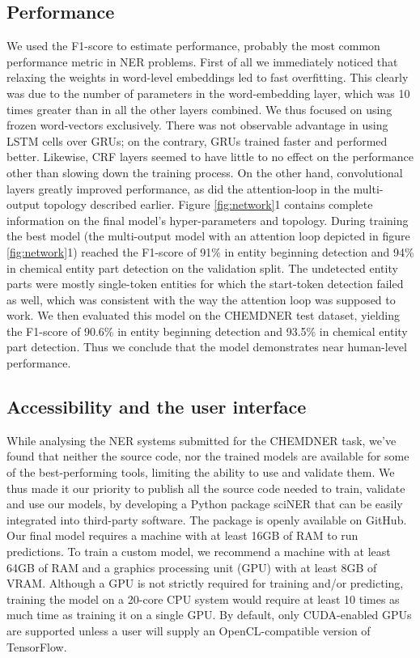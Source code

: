 \documentclass[twocolumn]{bmcart}%
\begin{document}
\subsection*{Performance}

We used the F1-score to estimate performance, probably the most common performance metric in NER problems. 
First of all we immediately noticed that relaxing the weights in word-level embeddings led to fast overfitting.
This clearly was due to the number of parameters in the word-embedding layer, which was 10 times greater than in all the other layers combined.
We thus focused on using frozen word-vectors exclusively.
There was not observable advantage in using LSTM cells over GRUs; on the contrary, GRUs trained faster and performed better.
Likewise, CRF layers seemed to have little to no effect on the performance other than slowing down the training process.
On the other hand, convolutional layers greatly improved performance, as did the attention-loop in the multi-output topology described earlier.
Figure \ref{fig:network}{1} contains complete information on the final model's hyper-parameters and topology.
During training the best model (the multi-output model with an attention loop depicted in figure \ref{fig:network}{1}) reached the F1-score of 91\% in entity beginning detection and 94\% in chemical entity part detection on the validation split.
The undetected entity parts were mostly single-token entities for which the start-token detection failed as well, which was consistent with the way the attention loop was supposed to work.
We then evaluated this model on the CHEMDNER test dataset, yielding the F1-score of 90.6\% in entity beginning detection and 93.5\% in chemical entity part detection.
Thus we conclude that the model demonstrates near human-level performance.
 
\subsection*{Accessibility and the user interface}

While analysing the NER systems submitted for the CHEMDNER task, we've found that neither the source code, nor the trained models are available for some of the best-performing tools, limiting the ability to use and validate them.
We thus made it our priority to publish all the source code needed to train, validate and use our models, by developing a Python package sciNER that can be easily integrated into third-party software.
The package is openly available on GitHub.
Our final model requires a machine with at least 16GB of RAM to run predictions. 
To train a custom model, we recommend a machine with at least 64GB of RAM and a graphics processing unit (GPU) with at least 8GB of VRAM. 
Although a GPU is not strictly required for training and/or predicting, training the model on a 20-core CPU system would require at least 10 times as much time as training it on a single GPU.
By default, only CUDA-enabled GPUs are supported unless a user will supply an OpenCL-compatible version of TensorFlow.
\end{document}
